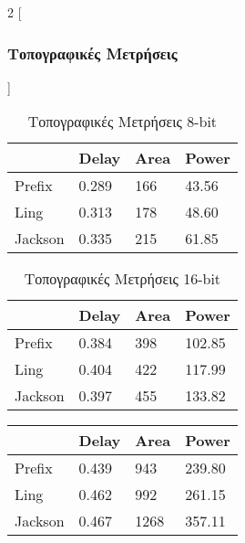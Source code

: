\begin{multicols}{2}
[\subsubsection{Τοπογραφικές Μετρήσεις}]

\begin{table}[H]
\centering
     \begin{tabular}{||p{1.2cm} | p{0.7cm} p{1cm} p{1cm} ||} 
        \hline
         & Delay & Area & Power \\ [0.5ex]
        \hline\hline
        Prefix & 0.289 & 166 & 43.56 \\
        \hline
        Ling & 0.313 & 178 & 48.60 \\
        \hline
        Jackson & 0.335 & 215 & 61.85 \\
        \hline
    \end{tabular}
\caption{Τοπογραφικές Μετρήσεις 8-bit}
\label{topo_result_table_8}
\end{table}
\begin{table}[H]
\centering
     \begin{tabular}{||p{1.2cm} | p{0.7cm} p{1cm} p{1cm} ||} 
        \hline
         & Delay & Area & Power \\ [0.5ex] 
        \hline\hline
        Prefix & 0.384 & 398 & 102.85 \\
        \hline
        Ling & 0.404 & 422 & 117.99 \\
        \hline
        Jackson & 0.397 & 455 & 133.82 \\
        \hline
    \end{tabular}
\caption{Τοπογραφικές Μετρήσεις 16-bit}
\label{topo_result_table_16}
\end{table}
\begin{table}[H]
\centering
     \begin{tabular}{||p{1.2cm} | p{0.7cm} p{1cm} p{1cm} ||} 
        \hline
         & Delay & Area & Power \\ [0.5ex]
        \hline\hline
        Prefix & 0.439 & 943 & 239.80 \\
        \hline
        Ling & 0.462 & 992 & 261.15 \\
        \hline
        Jackson & 0.467 & 1268 & 357.11 \\
        \hline
    \end{tabular}

\end{table}
\end{multicols}
